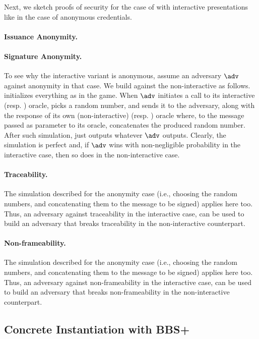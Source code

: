 Next, we sketch proofs of security for the case of \GSAC with interactive
presentations like in the case of anonymous credentials.

\paragraph{Issuance Anonymity.} 

\paragraph{Signature Anonymity.} To see why the interactive variant is
anonymous, assume an adversary $\adv$ against anonymity in that case. We build
\advB against the non-interactive \ExpGSACSigAnonb as follows. \advB initializes
everything as in the \ExpGSACSigAnonb game. When $\adv$ initiates a call to its
interactive \SIGN (resp. \CHALb) oracle, \advB picks a random number, and sends
it to the adversary, along with the response of its own (non-interactive) \SIGN
(resp. \CHALb) oracle where, to the message passed as parameter to its oracle,
concatenates the produced random number. After such simulation, \advB just
outputs whatever $\adv$ outputs. Clearly, the simulation is perfect and, if
$\adv$ wins with non-negligible probability in the interactive case, then so
does \advB in the non-interactive case.

\paragraph{Traceability.} The simulation described for the anonymity case (i.e.,
\advB choosing the random numbers, and concatenating them to the message to be
signed) applies here too. Thus, an adversary against traceability in the
interactive case, can be used to build an adversary that breaks traceability in
the non-interactive counterpart.

\paragraph{Non-frameability.} The simulation described for the anonymity case
(i.e., \advB choosing the random numbers, and concatenating them to the message
to be signed) applies here too. Thus, an adversary against non-frameability in
the interactive case, can be used to build an adversary that breaks
non-frameability in the non-interactive counterpart. 

\subsection{Concrete Instantiation with BBS+}
\label{sapp:gsac-instantiation}

